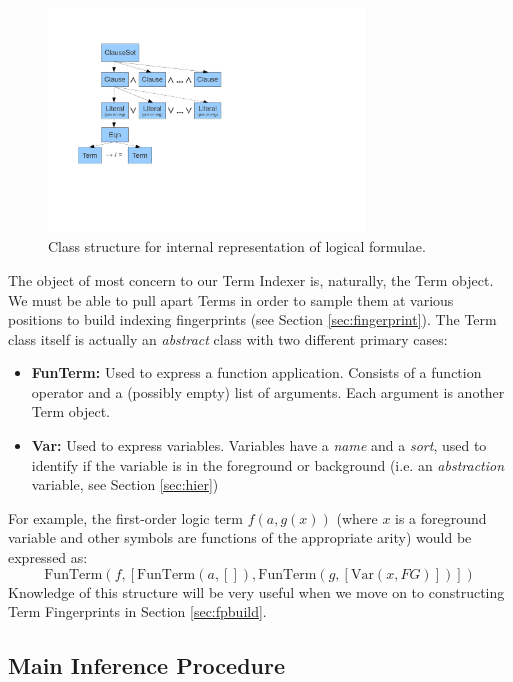 \begin{figure}[H]
  \centering
  \includegraphics[clip,trim=2.5cm 5cm 13cm 2cm,width=0.75\textwidth]{resources/logicstructure}
  \caption
   {Class structure for internal representation of logical formulae.}
   \label{fig:expressions}
\end{figure}

The object of most concern to our Term Indexer is, naturally, the Term object.
We must be able to pull apart Terms in order to sample them at various positions
to build indexing fingerprints (see Section \ref{sec:fingerprint}). The Term
class itself is actually an \emph{abstract} class with two different primary cases:
\begin{itemize}
\item[] \textbf{FunTerm:} Used to express a function application. Consists of
a function operator and a (possibly empty) list of arguments. Each argument
is another Term object.
\item[] \textbf{Var:} Used to express variables. Variables have a \emph{name}
and a \emph{sort}, used to identify if the variable is in the foreground
or background (i.e. an \emph{abstraction} variable, see Section \ref{sec:hier})
\end{itemize}

For example, the first-order logic term $f(a, g(x))$ (where $x$ is a foreground
variable and other symbols are functions of the appropriate arity) would be expressed as:
\[\text{FunTerm}(f, [\text{FunTerm}(a, []), \text{FunTerm}(g, [\text{Var}(x, FG)])] )\]
Knowledge of this structure will be very useful when we move on to constructing
Term Fingerprints in Section \ref{sec:fpbuild}.

\subsection{Main Inference Procedure}
\label{sec:mloop}

